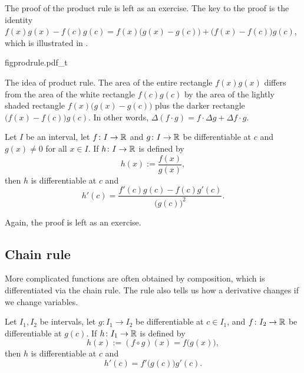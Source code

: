 The proof of the product rule is left as an exercise.  The key to the proof is 
the identity
$f(x) g(x) - f(c) g(c) =
f(x)\bigl( g(x) - g(c) \bigr)
+ \bigl( f(x) - f(c) \bigr) g(c)$,
which is illustrated in .
\begin{myfigureht}
{figprodrule.pdf_t}
\caption{The idea of product rule.  The area of the entire rectangle
$f(x)g(x)$ differs from the area of the white rectangle $f(c)g(c)$
by the area of the lightly shaded rectangle
$f(x)\bigl( g(x) - g(c) \bigr)$ plus the darker rectangle
$\bigl( f(x) - f(c) \bigr) g(c)$.
In other words, $\Delta (f \cdot g)
= f \cdot \Delta g + \Delta f \cdot g$.\label{figprodrule}}
\end{myfigureht}



\begin{prop}
Let $I$ be an interval, let
$f \colon I \to {\mathbb{R}}$ and $g \colon I \to {\mathbb{R}}$ be differentiable at $c$
and $g(x) \not= 0$ for all $x \in I$.
If $h \colon I \to {\mathbb{R}}$
is defined by
\begin{equation*}
h(x) := \frac{f(x)}{g(x)},
\end{equation*}
then $h$ is differentiable at $c$ and
\begin{equation*}
h'(c) = \frac{f'(c) g(c) - f(c) g'(c)}{{\bigl(g(c)\bigr)}^2} .
\end{equation*}
\end{prop}

Again, the proof is left as an exercise.

\subsection{Chain rule}

More complicated functions are often obtained by composition,
which is differentiated via the chain rule.  The rule also tells us
how a derivative changes if we change variables.

\begin{prop}
Let $I_1, I_2$ be intervals, let
$g \colon I_1 \to I_2$ be differentiable at $c \in I_1$,
and
$f \colon I_2 \to {\mathbb{R}}$ be differentiable at $g(c)$.
If $h \colon I_1 \to {\mathbb{R}}$
is defined by
\begin{equation*}
h(x) := (f \circ g) (x) = f\bigl(g(x)\bigr) ,
\end{equation*}
then $h$ is differentiable at $c$ and
\begin{equation*}
h'(c) = f'\bigl(g(c)\bigr)g'(c) .
\end{equation*}
\end{prop}

